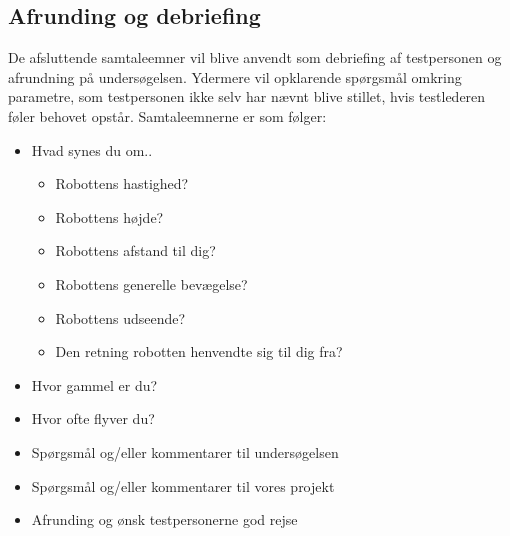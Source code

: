 \subsection{Afrunding og debriefing} 
\label{ParametreAfrundingDebriefing}
%
De afsluttende samtaleemner vil blive anvendt som debriefing af testpersonen og afrundning på undersøgelsen. Ydermere vil opklarende spørgsmål omkring parametre, som testpersonen ikke selv har nævnt blive stillet, hvis testlederen føler behovet opstår.  Samtaleemnerne er som følger: \blankline
%
\begin{itemize}
\item Hvad synes du om..
	\begin{itemize}
		\item Robottens hastighed?
		\item Robottens højde?
		\item Robottens afstand til dig?
		\item Robottens generelle bevægelse?
		\item Robottens udseende?
		\item Den retning robotten henvendte sig til dig fra?
	\end{itemize}
\item Hvor gammel er du?
\item Hvor ofte flyver du?
\item Spørgsmål og/eller kommentarer til undersøgelsen 
\item Spørgsmål og/eller kommentarer til vores projekt
\item Afrunding og ønsk testpersonerne god rejse
\end{itemize}

